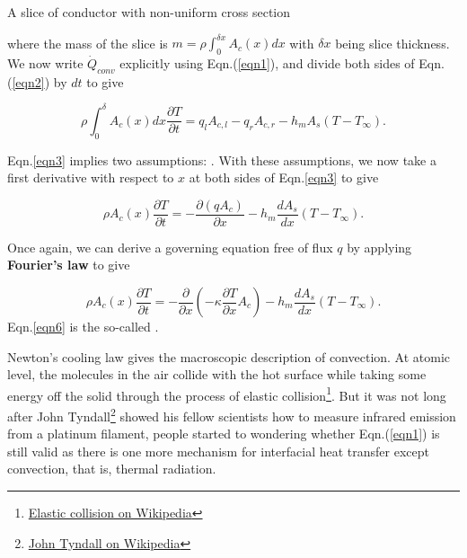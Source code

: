 \begin{marginfigure}
\begin{tikzpicture}[x=0.66pt,y=0.66pt,yscale=-1,xscale=1]
\end{tikzpicture}
\caption{A slice of conductor with non-uniform cross section}
\label{fig4}
\end{marginfigure}
\noindent where the mass of the slice is $m=\rho\int_0^{\delta x} A_c(x)dx$ with $\delta x$ being slice thickness. We now write $\dot{Q}_{conv}$ explicitly using Eqn.(\ref{eqn1}), and divide both sides of Eqn. (\ref{eqn2}) by $dt$ to give

\begin{equation}
    \rho\int_0^{\delta} A_c(x)dx\frac{\partial T}{\partial t}=q_lA_{c,l}-q_rA_{c,r}-h_mA_s(T-T_{\infty}).
    \label{eqn3}
\end{equation}

Eqn.\ref{eqn3} implies two assumptions: . With these assumptions, we now take a first derivative with respect to $x$ at both sides of Eqn.\ref{eqn3} to give

\begin{equation}
    \rho A_c(x)\frac{\partial T}{\partial t}=-\frac{\partial (qA_c)}{\partial x}-h_m\frac{d A_s}{dx}(T-T_{\infty}).
\end{equation}

Once again, we can derive a governing equation free of flux $q$ by applying \textbf{Fourier's law} to give

\begin{equation}
    \rho A_c(x)\frac{\partial T}{\partial t}=-\frac{\partial }{\partial x}\left(-\kappa\frac{\partial T}{\partial x}A_c\right)-h_m\frac{d A_s}{dx}(T-T_{\infty}).
    \label{eqn6}
\end{equation}
Eqn.\ref{eqn6} is the so-called .

Newton's cooling law gives the macroscopic description of convection. At atomic level, the molecules in the air collide with the hot surface while taking some energy off the solid through the process of elastic collision\footnote{\href{https://en.wikipedia.org/wiki/Elastic_collision}{Elastic collision on Wikipedia}}. But it was not long after John Tyndall\footnote{\href{https://en.wikipedia.org/wiki/John_Tyndall}{John Tyndall on Wikipedia}} showed his fellow scientists how to measure infrared emission from a platinum filament, people started to wondering whether Eqn.(\ref{eqn1}) is still valid as there is one more mechanism for interfacial heat transfer except convection, that is, thermal radiation.

